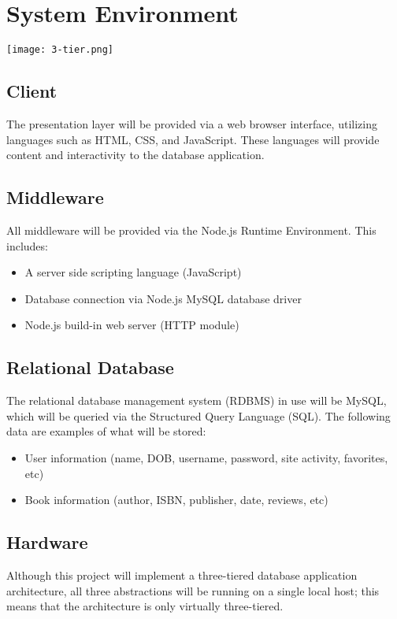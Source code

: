 \documentclass[titlepage]{article}
\begin{document}
	\section{System Environment}

	\texttt{[image: 3-tier.png]}

	\subsection{Client}
		The presentation layer will be provided via a web browser interface, utilizing languages such as HTML, CSS, and JavaScript. These languages will provide content and interactivity to the database application.
	\subsection{Middleware}
		All middleware will be provided via the Node.js Runtime Environment. This includes:
	\begin{itemize}
		\item A server side scripting language (JavaScript)
		\item Database connection via Node.js MySQL database driver
		\item Node.js build-in web server (HTTP module)
	\end{itemize}

	\subsection{Relational Database}
		The relational database management system (RDBMS) in use will be MySQL, which will be queried via the Structured Query Language (SQL). The following data are examples of what will be stored:
	\begin{itemize}
		\item User information (name, DOB, username, password, site activity, favorites, etc)
		\item Book information (author, ISBN, publisher, date, reviews, etc)
	\end{itemize}

	\subsection{Hardware}
		Although this project will implement a three-tiered database application architecture, all three abstractions will be running on a single local host; this means that the architecture is only virtually three-tiered.
\end{document}
